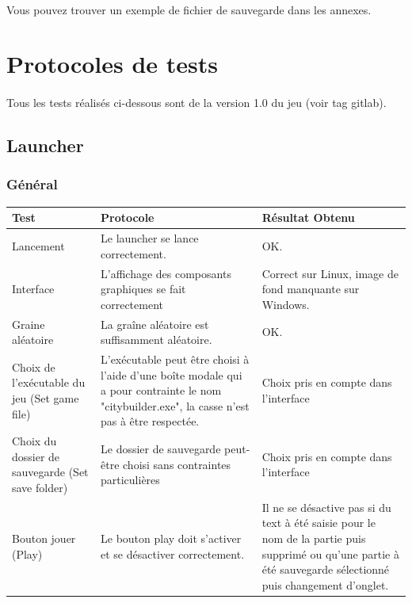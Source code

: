 \documentclass[a4paper,10pt,openany,oneside]{report}
\begin{document}
\paragraph{}
Vous pouvez trouver un exemple de fichier de sauvegarde dans les annexes.

\section{Protocoles de tests}
\thispagestyle{headings}
\paragraph{}
Tous les tests réalisés ci-dessous sont de la version 1.0 du jeu (voir tag gitlab).
\subsection{Launcher}

\subsubsection{Général}
\begin{center}
	\begin{tabular}{| p{3cm} | p{6cm} | p{6cm} |}
	\hline
		 \textbf{Test} & \textbf{Protocole} & \textbf{Résultat Obtenu}
		 \\ \hline
		 Lancement & Le launcher se lance correctement. & OK.
		 \\ \hline
		 Interface & L'affichage des composants graphiques se fait correctement & Correct sur Linux, image de fond manquante sur Windows.
		 \\ \hline
		 Graine aléatoire & La graîne aléatoire est suffisamment aléatoire. & OK.
		 \\ \hline
		Choix de l'exécutable du jeu (Set game file)&
		L'exécutable peut être choisi à l'aide d'une boîte modale qui a pour contrainte le nom "citybuilder.exe", la casse n'est pas à être respectée. &
		Choix pris en compte dans l'interface
		\\ \hline
		Choix du dossier de sauvegarde (Set save folder) &
		Le dossier de sauvegarde peut-être choisi sans contraintes particulières &
		Choix pris en compte dans l'interface
		\\ \hline
		Bouton jouer (Play) &
		Le bouton play doit s'activer et se désactiver correctement. &
		Il ne se désactive pas si du text à été saisie pour le nom de la partie puis supprimé ou qu'une partie à été sauvegarde sélectionné puis changement d'onglet.
		\\ \hline
	\end{tabular}
\end{center}
\end{document}
